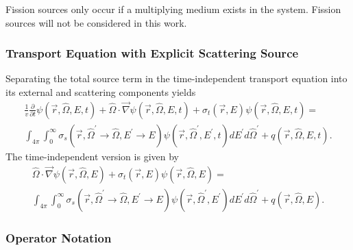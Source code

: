 Fission sources only occur if a multiplying medium exists in the system.
Fission sources will not be considered in this work.

\subsubsection{Transport Equation with Explicit Scattering Source}
\label{sec:bg:rt:te:te2}

Separating the total source term in the time-independent transport equation into its external and scattering components yields
\begin{multline}\label{eq:bg:rt:transport-timedep}
  \frac{1}{v}\frac{\partial}{\partial t}\psi\left(\vec{r},\hat{\Omega},E,t\right) +
  \hat{\Omega}\cdot\vec{\nabla}\psi\left(\vec{r},\hat{\Omega},E,t\right) +
  \sigma_t\left(\vec{r},E\right)\psi\left(\vec{r},\hat{\Omega},E,t\right) = \\
  \int_{4\pi}\int_0^\infty\sigma_s\left(\vec{r},\hat{\Omega}^\prime\rightarrow\hat{\Omega},E^\prime\rightarrow E\right)\psi\left(\vec{r},\hat{\Omega}^\prime,E^\prime,t\right)dE^\prime d\hat{\Omega}^\prime +
  q\left(\vec{r},\hat{\Omega},E,t\right).
\end{multline}
The time-independent version is given by 
\begin{multline}\label{eq:bg:rt:transport}
  \hat{\Omega}\cdot\vec{\nabla}\psi\left(\vec{r},\hat{\Omega},E\right) +
  \sigma_t\left(\vec{r},E\right)\psi\left(\vec{r},\hat{\Omega},E\right) = \\
  \int_{4\pi}\int_0^\infty\sigma_s\left(\vec{r},\hat{\Omega}^\prime\rightarrow\hat{\Omega},E^\prime\rightarrow E\right)\psi\left(\vec{r},\hat{\Omega}^\prime,E^\prime\right)dE^\prime d\hat{\Omega}^\prime +
  q\left(\vec{r},\hat{\Omega},E\right).
\end{multline}

\subsubsection{Operator Notation}
\label{sec:bg:rt:te:on}

